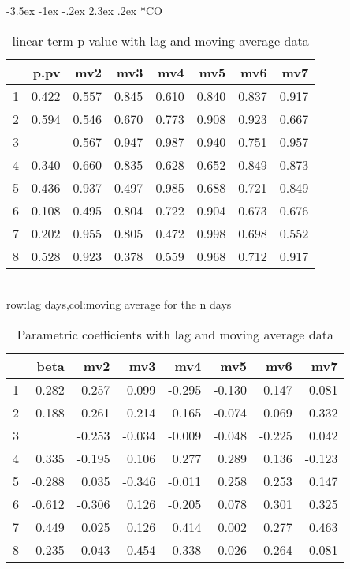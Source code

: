\documentclass[a4paper, 12pt]{article}
\makeatletter
\def\large{\fontsize{14}{20}\selectfont}
\renewcommand\subsection{\@startsection {subsection}{1}{\z@}%
                                   {-3.5ex \@plus -1ex \@minus -.2ex}%
                                   {2.3ex \@plus.2ex}%
                                   {\centering\normalfont\large\bfseries}}
\makeatother
\begin{document}
\subsection*{CO}
\begin{table}[h]
\centering
\caption{linear term p-value with lag and moving average data}
\begin{tabular}{rrrrrrrr}
  \hline
 & p.pv & mv2 & mv3 & mv4 & mv5 & mv6 & mv7 \\
  \hline
1 & 0.422 & 0.557 & 0.845 & 0.610 & 0.840 & 0.837 & 0.917 \\
  2 & 0.594 & 0.546 & 0.670 & 0.773 & 0.908 & 0.923 & 0.667 \\
  3 & \color{red}{0.052} & 0.567 & 0.947 & 0.987 & 0.940 & 0.751 & 0.957 \\
  4 & 0.340 & 0.660 & 0.835 & 0.628 & 0.652 & 0.849 & 0.873 \\
  5 & 0.436 & 0.937 & 0.497 & 0.985 & 0.688 & 0.721 & 0.849 \\
  6 & 0.108 & 0.495 & 0.804 & 0.722 & 0.904 & 0.673 & 0.676 \\
  7 & 0.202 & 0.955 & 0.805 & 0.472 & 0.998 & 0.698 & 0.552 \\
  8 & 0.528 & 0.923 & 0.378 & 0.559 & 0.968 & 0.712 & 0.917 \\
   \hline
\end{tabular}
\\row:lag days,col:moving average for the n days
\end{table}
\begin{table}[h]
\centering
\caption{Parametric coefficients with lag and moving average data}
\begin{tabular}{rrrrrrrr}
  \hline
 & beta & mv2 & mv3 & mv4 & mv5 & mv6 & mv7 \\
  \hline
1 & 0.282 & 0.257 & 0.099 & -0.295 & -0.130 & 0.147 & 0.081 \\
  2 & 0.188 & 0.261 & 0.214 & 0.165 & -0.074 & 0.069 & 0.332 \\
  3 & \color{red}{-0.735} & -0.253 & -0.034 & -0.009 & -0.048 & -0.225 & 0.042 \\
  4 & 0.335 & -0.195 & 0.106 & 0.277 & 0.289 & 0.136 & -0.123 \\
  5 & -0.288 & 0.035 & -0.346 & -0.011 & 0.258 & 0.253 & 0.147 \\
  6 & -0.612 & -0.306 & 0.126 & -0.205 & 0.078 & 0.301 & 0.325 \\
  7 & 0.449 & 0.025 & 0.126 & 0.414 & 0.002 & 0.277 & 0.463 \\
  8 & -0.235 & -0.043 & -0.454 & -0.338 & 0.026 & -0.264 & 0.081 \\
   \hline
\end{tabular}
\end{table}
\end{document}
